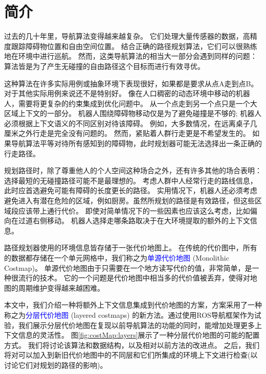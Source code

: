 

\section{简介}

过去的几十年里，导航算法变得越来越复杂。
它们处理大量传感器的数据，高精度跟踪障碍物位置和自由空间位置。
结合正确的路径规划算法，它们可以很熟练地在环境中进行巡航。
然而，这类导航算法的相当大一部分会遇到同样的问题：算法皆是为了产生无碰撞的自由路径这个目标而进行有效寻优。

这种算法在许多实际用例或抽象环境下表现很好，如果都是要求从点A走到点B。
对于其他实际用例来说还不是特别好。
像在人口稠密的动态环境中移动的机器人，需要将更复杂的约束集成到优化问题中。
从一个点走到另一个点只是一个大区域上下文的一部分。
机器人围绕障碍物移动仅是为了避免碰撞是不够的;
机器人必须根据上下文语义的不同区别对待该障碍。
例如，大多数情况，在远离桌子几厘米之外行走是完全没有问题的。
然而，紧贴着人群行走更是不希望发生的。
如果导航算法平等对待所有感知到的障碍物，此时规划器可能无法选择出一条正确的行走路径。


规划路径时，除了尊重他人的个人空间这种场合之外，还有许多其他的场合表明：选择最短的无碰撞路径可能不是最理想的。
考虑人群中人经常行走的路线信息，此时应首选避免可能有障碍的长度更长的路径。
实用情况下，机器人还必须考虑避免进入有潜在危险的区域，例如厨房。虽然所规划的路径是有效路径，但这些区域段应该带上通行代价。
即使对简单情况下的一些因素也应该这么考虑，比如偏向在过道右侧移动。
机器人选择走哪条路取决于在大环境提取的额外的上下文信息。

路径规划器使用的环境信息皆存储于一张代价地图上。
在传统的代价图中，所有的数据都存储在一个单元网格中，我们称之为\textcolor{blue}{\kaishu 单源代价地图} (Monolithic Costmap)。
单源代价地图由于只需要在一个地方读写代价的值，非常简单，是一种很流行的技术。
它的一个问题是代价地图中相当多的代价值被丢弃，使得对地图的周期维护变得越来越困难。

本文中，我们介绍一种将额外上下文信息集成到代价地图的方案，方案采用了一种称之为\textcolor{blue}{\kaishu 分层代价地图} (layered costmaps) 的新方法。通过使用ROS导航框架作为试验，我们展示分层代价地图在复现以前导航算法的功能的同时，能增加处理更多上下文信息的灵活性。
图\ref{fig:costMap:layers}展示了一种分层代价地图的可能的配置方式。
我们将讨论该算法和数据结构，以及相对以前方法的改进点。
之后，我们将对可以加入到新旧代价地图中的不同层和它们所集成的环境上下文进行检查(以讨论它们对规划的路径的影响)。

